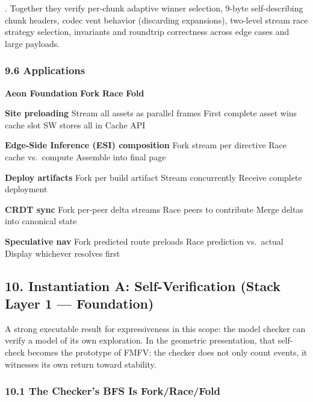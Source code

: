 \documentclass[
]{article}
\begin{document}
. Together they verify per-chunk adaptive winner selection, 9-byte
self-describing chunk headers, codec vent behavior (discarding
expansions), two-level stream race strategy selection, invariants and
roundtrip correctness across edge cases and large payloads.

\subsubsection{\texorpdfstring{\textbf{9.6
Applications}}{9.6 Applications}}\label{applications}

\textbf{Aeon Foundation} \textbar{} \textbf{Fork} \textbar{}
\textbf{Race} \textbar{} \textbf{Fold} \textbar{}

\textbf{Site preloading} \textbar{} Stream all assets as parallel frames
\textbar{} First complete asset wins cache slot \textbar{} SW stores all
in Cache API \textbar{}

\textbf{Edge-Side Inference (ESI) composition} \textbar{} Fork stream
per directive \textbar{} Race cache vs.~compute \textbar{} Assemble into
final page \textbar{}

\textbf{Deploy artifacts} \textbar{} Fork per build artifact \textbar{}
Stream concurrently \textbar{} Receive complete deployment \textbar{}

\textbf{CRDT sync} \textbar{} Fork per-peer delta streams \textbar{}
Race peers to contribute \textbar{} Merge deltas into canonical state
\textbar{}

\textbf{Speculative nav} \textbar{} Fork predicted route preloads
\textbar{} Race prediction vs.~actual \textbar{} Display whichever
resolves first \textbar{}

\subsection{\texorpdfstring{\textbf{10. Instantiation A:
Self-Verification (Stack Layer 1 ---
Foundation)}}{10. Instantiation A: Self-Verification (Stack Layer 1 --- Foundation)}}\label{instantiation-a-self-verification-stack-layer-1-foundation}

A strong executable result for expressiveness in this scope: the model
checker can verify a model of its own exploration. In the geometric
presentation, that self-check becomes the prototype of FMFV: the checker
does not only count events, it witnesses its own return toward
stability.

\subsubsection{\texorpdfstring{\textbf{10.1 The Checker's BFS Is
Fork/Race/Fold}}{10.1 The Checker's BFS Is Fork/Race/Fold}}\label{the-checkers-bfs-is-forkracefold}
\end{document}

